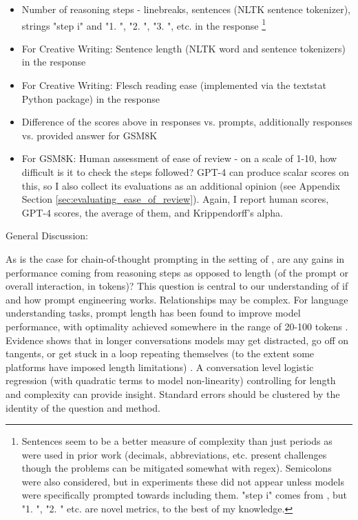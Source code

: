 \documentclass[11pt]{article}
\begin{document}
\begin{itemize}
  \item Number of reasoning steps - linebreaks, sentences (NLTK sentence tokenizer), strings "step i" and "1. ", "2. ", "3. ", etc. in the response \cite{fu_complexity-based_2023} \footnote{Sentences seem to be a better measure of complexity than just periods as were used in prior work (decimals, abbreviations, etc. present challenges though the problems can be mitigated somewhat with regex). Semicolons were also considered, but in experiments these did not appear unless models were specifically prompted towards including them. "step i" comes from \citealp{fu_complexity-based_2023}, but "1. ", "2. " etc. are novel metrics, to the best of my knowledge.}
  \item For Creative Writing: Sentence length (NLTK word and sentence tokenizers) in the response
  \item For Creative Writing: Flesch reading ease (implemented via the textstat Python package) in the response \cite{flesch_how_2016, aggarwal_textstat_nodate}
  \item Difference of the scores above in responses vs. prompts, additionally responses vs. provided answer for GSM8K
  \item For GSM8K: Human assessment of ease of review - on a scale of 1-10, how difficult is it to check the steps followed? GPT-4 can produce scalar scores on this, so I also collect its evaluations as an additional opinion (see Appendix Section \ref{sec:evaluating_ease_of_review}). Again, I report human scores, GPT-4 scores, the average of them, and Krippendorff's alpha.
\end{itemize}

%

General Discussion:

As is the case for chain-of-thought prompting in the setting of \citealp{fu_complexity-based_2023}, are any gains in performance coming from reasoning steps as opposed to length (of the prompt or overall interaction, in tokens)? This question is central to our understanding of if and how prompt engineering works. Relationships may be complex. For language understanding tasks, prompt length has been found to improve model performance, with optimality achieved somewhere in the range of 20-100 tokens \cite{lester_power_2021}. Evidence shows that in longer conversations models may get distracted, go off on tangents, or get stuck in a loop repeating themselves (to the extent some platforms have imposed length limitations) \cite{shi_large_2023, mann_microsoft_nodate}. A conversation level logistic regression (with quadratic terms to model non-linearity) controlling for length and complexity can provide insight. Standard errors should be clustered by the identity of the question and method.
\end{document}

